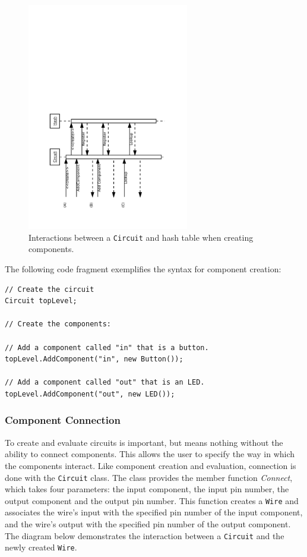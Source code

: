 \documentclass{article}
\newcommand{\ClassName}[1]{\texttt{#1}}
\newcommand{\FunctionName}[1]{\textit{#1}}
\begin{document}
\begin{figure}[H]
    \begin{center}
        \includegraphics[angle=270,width=200pt]{imgs/ComponentCreationInteraction.pdf}
    \end{center}
    \caption{Interactions between a \ClassName{Circuit} and hash table when creating components.}
\end{figure}

The following code fragment exemplifies the syntax for component creation:

\begin{lstlisting}
// Create the circuit
Circuit topLevel;

// Create the components:

// Add a component called "in" that is a button.
topLevel.AddComponent("in", new Button());

// Add a component called "out" that is an LED.
topLevel.AddComponent("out", new LED());
\end{lstlisting}

\subsubsection{Component Connection}

To create and evaluate circuits is important, but means nothing without the ability to connect components. This allows the user to specify the way in which the components interact. Like component creation and evaluation, connection is done with the \ClassName{Circuit} class. The class provides the member function \FunctionName{Connect}, which takes four parameters: the input component, the input pin number, the output component and the output pin number. This function creates a \ClassName{Wire} and associates the wire's input with the specified pin number of the input component, and the wire's output with the specified pin number of the output component. The diagram below demonstrates the interaction between a \ClassName{Circuit} and the newly created \ClassName{Wire}.
\end{document}
